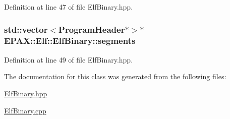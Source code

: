 \-Definition at line 47 of file \-Elf\-Binary.\-hpp.

\hypertarget{class_e_p_a_x_1_1_elf_1_1_elf_binary_a75dbde6b29cdcd5297e18645c165d7d5}{
\subsubsection[{segments}]{\setlength{\rightskip}{0pt plus 5cm}std\-::vector$<${\bf \-Program\-Header}$\ast$$>$$\ast$ {\bf \-E\-P\-A\-X\-::\-Elf\-::\-Elf\-Binary\-::segments}}}\label{class_e_p_a_x_1_1_elf_1_1_elf_binary_a75dbde6b29cdcd5297e18645c165d7d5}


\-Definition at line 49 of file \-Elf\-Binary.\-hpp.



\-The documentation for this class was generated from the following files\-:\begin{DoxyCompactItemize}
\item 
\hyperlink{_elf_binary_8hpp}{\-Elf\-Binary.\-hpp}\item 
\hyperlink{_elf_binary_8cpp}{\-Elf\-Binary.\-cpp}\end{DoxyCompactItemize}
